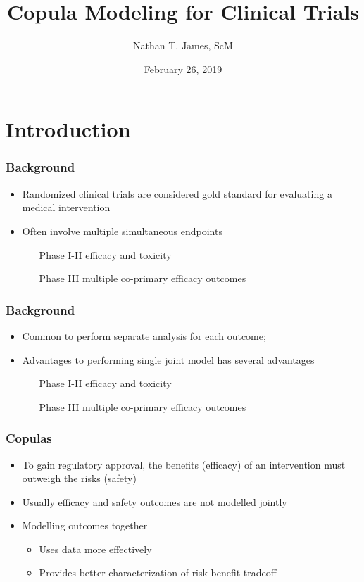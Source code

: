 \documentclass{beamer}
\title[Bayesian Copula Modeling for Clinical Trials]{Copula Modeling for Clinical Trials}
\author{Nathan T. James, ScM}
\institute{Department of Biostatistics, Vanderbilt University}
\date{February 26, 2019}
\begin{document}
	
	\frame{\titlepage}	
	
\section{Introduction}

	\begin{frame}
		\frametitle{Background}
		\begin{itemize}
			\setlength\itemsep{2em}
			\item Randomized clinical trials are considered gold standard for evaluating a medical intervention
			\item Often involve multiple simultaneous endpoints
				\begin{itemize}
					\setlength{\itemindent}{.5in}
					\item[Phase I-II] efficacy and toxicity
					\item[Phase III]  multiple co-primary efficacy outcomes
				\end{itemize}
	     \end{itemize}
	\end{frame}

	\begin{frame}
		\frametitle{Background}
		\begin{itemize}
			\setlength\itemsep{2em}
			\item Common to perform separate analysis for each outcome;
			
			\item Advantages to performing single joint model has several advantages
			\begin{itemize}
				\setlength{\itemindent}{.5in}
				\item[Phase I-II] efficacy and toxicity
				\item[Phase III]  multiple co-primary efficacy outcomes
			\end{itemize}
		\end{itemize}
	\end{frame}
	
	\begin{frame}
		\frametitle{Copulas}
		\begin{itemize}
			\setlength\itemsep{2em}
			\item To gain regulatory approval, the benefits (efficacy) of an intervention must outweigh the risks (safety) 
			\item Usually efficacy and safety outcomes are not modelled jointly
			\item Modelling outcomes together
			\begin{itemize}
				\item Uses data more effectively 
				\item Provides better characterization of risk-benefit tradeoff
			\end{itemize}
		\end{itemize}
	\end{frame}
					
\end{document}
